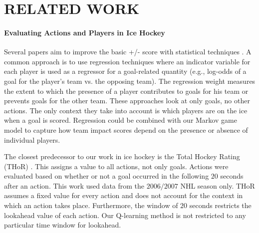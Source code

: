 \documentclass[]{article}
\begin{document}

\section{RELATED WORK}
\label{sec:related-work}








\paragraph{Evaluating Actions and Players in Ice Hockey} Several papers aim to improve the basic +/- score with statistical techniques \citep{Macdonald2011a,Gramacy2013,Spagnola2013}. A common approach is to use regression techniques where an indicator variable for each player is used as a regressor for a goal-related quantity (e.g., log-odds of a goal for the player's team vs. the opposing team). The regression weight measures the extent to which the presence of a player contributes to goals for his team or prevents goals for the other team. These approaches look at only goals, no other actions. The only context they take into account is which players are on the ice when a goal is scored. Regression could be combined with our Markov game model to capture how team impact scores depend on the presence or absence of individual players.

The closest predecessor to our work in ice hockey is the Total Hockey Rating (THoR) \citep{Schuckers2013}. This assigns a value to all actions, not only goals. Actions were evaluated based on whether or not a goal occurred in the following $20$ seconds after an action. %
This work used data from the $2006/2007$ NHL season only. THoR assumes a fixed value for every action and does not account for the context in which an action takes place. Furthermore, the window of $20$ seconds restricts the lookahead value of each action. Our Q-learning method is not restricted to any particular time window for lookahead.
\end{document}
